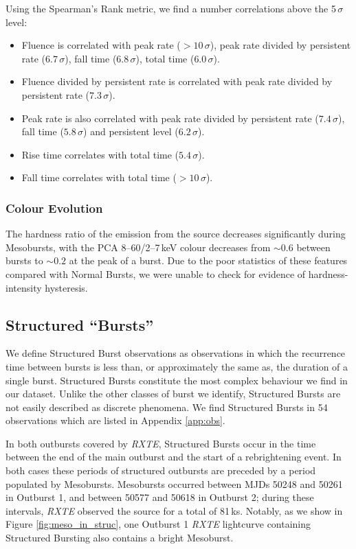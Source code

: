 \par Using the Spearman's Rank metric, we find a number correlations above the 5$\,\sigma$ level:
\begin{itemize}
\item Fluence is correlated with peak rate ($>10\,\sigma$), peak rate divided by persistent rate ($6.7\,\sigma$), fall time ($6.8\,\sigma$), total time ($6.0\,\sigma$).
\item Fluence divided by persistent rate is correlated with peak rate divided by persistent rate ($7.3\,\sigma$).
\item Peak rate is also correlated with peak rate divided by persistent rate ($7.4\,\sigma$), fall time ($5.8\,\sigma$) and persistent level ($6.2\,\sigma$).
\item Rise time correlates with total time ($5.4\,\sigma$).
\item Fall time correlates with total time ($>10\,\sigma$).
\end{itemize}

\subsubsection{Colour Evolution}

\par The hardness ratio of the emission from the source decreases significantly during Mesobursts, with the PCA 8--60/2--7\,keV colour decreases from $\sim0.6$ between bursts to $\sim0.2$ at the peak of a burst.  Due to the poor statistics of these features compared with Normal Bursts, we were unable to check for evidence of hardness-intensity hysteresis.

\subsection{Structured ``Bursts''}

\par We define Structured Burst observations as observations in which the recurrence time between bursts is less than, or approximately the same as, the duration of a single burst.  Structured Bursts constitute the most complex behaviour we find in our dataset.  Unlike the other classes of burst we identify, Structured Bursts are not easily described as discrete phenomena.  We find Structured Bursts in 54 observations which are listed in Appendix \ref{app:obs}.
\par In both outbursts covered by \textit{RXTE}, Structured Bursts occur in the time between the end of the main outburst and the start of a rebrightening event.  In both cases these periods of structured outbursts are preceded by a period populated by Mesobursts.  Mesobursts occurred between MJDs 50248 and 50261 in Outburst 1, and between 50577 and 50618 in Outburst 2; during these intervals, \textit{RXTE} observed the source for a total of 81\,ks.  Notably, as we show in Figure \ref{fig:meso_in_struc}, one Outburst 1 \textit{RXTE} lightcurve containing Structured Bursting also contains a bright Mesoburst.

